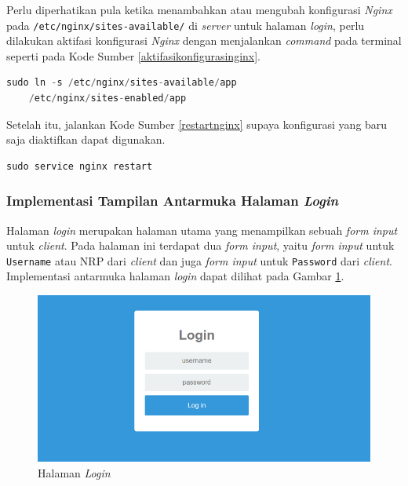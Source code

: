   Perlu diperhatikan pula ketika menambahkan atau mengubah konfigurasi \textit{Nginx} pada \texttt{/etc/nginx/sites-available/} di \textit{server} untuk halaman \textit{login}, perlu dilakukan aktifasi konfigurasi \textit{Nginx} dengan menjalankan \textit{command} pada terminal seperti pada Kode Sumber \ref{aktifasikonfigurasinginx}.\\
  \begin{minipage}{\linewidth}
  \begin{lstlisting}[caption=Command untuk mengaktifkan konfigurasi Nginx,language=Python,label=aktifasikonfigurasinginx]
  sudo ln -s /etc/nginx/sites-available/app 
    /etc/nginx/sites-enabled/app
  \end{lstlisting}
  \end{minipage}
  Setelah itu, jalankan Kode Sumber \ref{restartnginx} supaya konfigurasi yang baru saja diaktifkan dapat digunakan.\\
  \begin{minipage}{\linewidth}
  \begin{lstlisting}[caption=Command untuk merestart Nginx,language=Python,label=restartnginx]
  sudo service nginx restart
  \end{lstlisting}
  \end{minipage}
  
  \subsubsection{Implementasi Tampilan Antarmuka Halaman \textit{Login}}
  Halaman \textit{login} merupakan halaman utama yang menampilkan sebuah \textit{form input} untuk \textit{client}. Pada halaman ini terdapat dua \textit{form input}, yaitu \textit{form input} untuk \texttt{Username} atau NRP dari \textit{client} dan juga \textit{form input} untuk \texttt{Password} dari \textit{client}. Implementasi antarmuka halaman \textit{login} dapat dilihat pada Gambar \ref{implementasihalamanlogin}.
  
\begin{figure}[H]
	\centering
	\includegraphics[width=\linewidth]{images/bab4/halamanlogin}
	\caption{Halaman \textit{Login}}
	\label{implementasihalamanlogin}
\end{figure}
  
